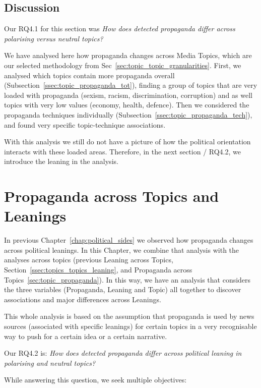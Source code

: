\subsection{\statusgreen Discussion}

Our RQ4.1 for this section was \emph{How does detected propaganda differ across polarising versus neutral topics?}

We have analysed here how propaganda changes across Media Topics, which are our selected methodology from Sec~\ref{sec:topic_topic_granularities}.
First, we analysed which topics contain more propaganda overall (Subsection~\ref{ssec:topic_propaganda_tot}), finding a group of topics that are very loaded with propaganda (sexism, racism, discrimination, corruption) and as well topics with very low values (economy, health, defence).
Then we considered the propaganda techniques individually (Subsection~\ref{ssec:topic_propaganda_tech}), and found very specific topic-technique associations.

With this analysis we still do not have a picture of how the political orientation interacts with these loaded areas. Therefore, in the next section / RQ4.2, we introduce the leaning in the analysis.



\section{\statusgreen Propaganda across Topics and Leanings}
\label{sec:topic_propaganda_leaning}

In previous Chapter~\ref{chap:political_sides} we observed how propaganda changes across political leanings.
In this Chapter, we combine that analysis with the analyses across topics (previous Leaning across Topics, Section~\ref{ssec:topics_topics_leaning}, and Propaganda across Topics~\ref{sec:topic_propaganda}).
In this way, we have an analysis that considers the three variables (Propaganda, Leaning and Topic) all together to discover associations and major differences across Leanings.

This whole analysis is based on the assumption that propaganda is used by news sources (associated with specific leanings) for certain topics in a very recognisable way to push for a certain idea or a certain narrative.

Our RQ4.2 is: \emph{How does detected propaganda differ across political leaning in polarising and neutral topics?}

While answering this question, we seek multiple objectives:

